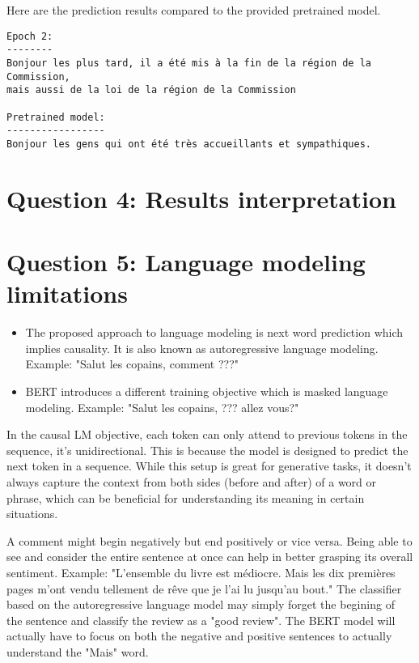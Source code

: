 \documentclass[a4paper]{article}
\begin{document}
Here are the prediction results compared to the provided pretrained model.

\begin{verbatim}
Epoch 2:
--------
Bonjour les plus tard, il a été mis à la fin de la région de la Commission,
mais aussi de la loi de la région de la Commission

Pretrained model:
-----------------
Bonjour les gens qui ont été très accueillants et sympathiques.
\end{verbatim}


\section{Question 4: Results interpretation}



\section{Question 5: Language modeling limitations}
\begin{itemize}
\item The proposed approach to language modeling is next word prediction which implies causality. It is also known as autoregressive language modeling.
Example: "Salut les copains, comment ???"
\item BERT \cite{devlin2019bert} introduces a different training objective which is masked language modeling. 
Example: "Salut les copains, ??? allez vous?"
\end{itemize}

In the causal LM objective, each token can only attend to previous tokens in the sequence, it's unidirectional. 
This is because the model is designed to predict the next token in a sequence. 
While this setup is great for generative tasks, it doesn't always capture the context from both sides (before and after) 
of a word or phrase, which can be beneficial for understanding its meaning in certain situations.

A comment might begin negatively but end positively or vice versa. Being able to see and consider the entire sentence at once can help in better grasping its overall sentiment.
Example: "L'ensemble du livre est médiocre. Mais les dix premières pages m'ont vendu tellement de rêve que je l'ai lu jusqu'au bout."
The classifier based on the autoregressive language model may simply forget the begining of the sentence and classify the review as a "good review".
The BERT model will actually have to focus on both the negative and positive sentences to actually understand the "Mais" word.
\end{document}
